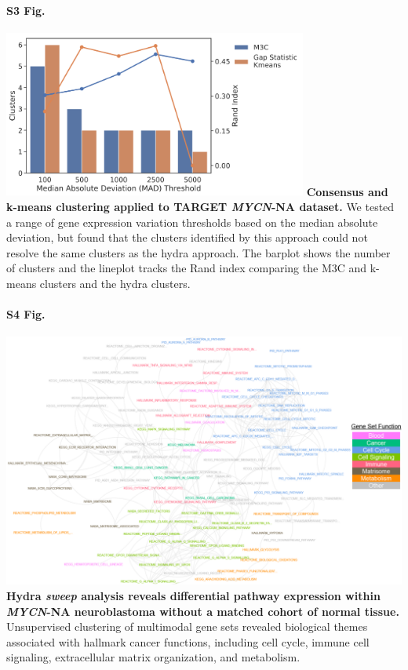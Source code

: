 \documentclass[10pt,letterpaper]{article}
\begin{document}
\paragraph*{S3 Fig.}
\includegraphics[width=0.75\textwidth]{img/PNG/clustering-screen}
\label{S3_Fig}
{\bf{Consensus and k-means clustering applied to TARGET \textit{MYCN}-NA dataset.}} We tested a range of gene expression variation thresholds based on the median absolute deviation, but found that the clusters identified by this approach could not resolve the same clusters as the hydra approach. The barplot shows the number of clusters and the lineplot tracks the Rand index comparing the M3C and k-means clusters and the hydra clusters.

\paragraph*{S4 Fig.}
\includegraphics[width=\textwidth]{img/PNG/sweep-gene-set-network-V4-2x}
\label{S4_Fig}{\bf Hydra \textit{sweep} analysis reveals differential pathway expression within \textit{MYCN}-NA neuroblastoma without a matched cohort of normal tissue.}
Unsupervised clustering of multimodal gene sets revealed biological themes associated with hallmark cancer functions, including cell cycle, immune cell signaling, extracellular matrix organization, and metabolism.
\end{document}
